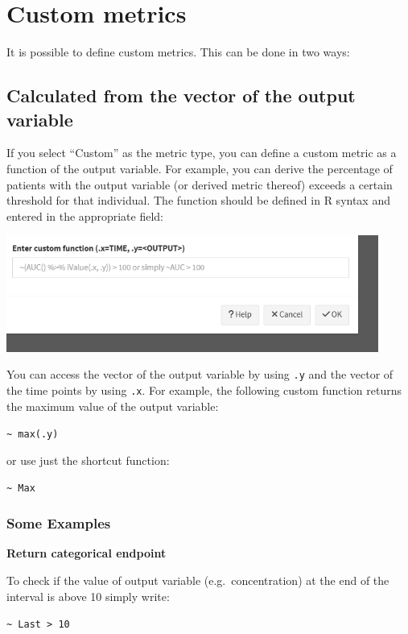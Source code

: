 \documentclass[
]{book}
\begin{document}
\section{Custom metrics}\label{custom-metrics}

It is possible to define custom metrics. This can be done in two ways:

\subsection{Calculated from the vector of the output variable}\label{calculated-from-the-vector-of-the-output-variable}

If you select ``Custom'' as the metric type, you can define a custom metric as a function of the output variable. For example, you can derive the percentage of patients with the output variable (or derived metric thereof) exceeds a certain threshold for that individual. The function should be defined in R syntax and entered in the appropriate field:

\includegraphics[width=4.8125in,height=\textheight]{pictures/custom-metric1.png}

You can access the vector of the output variable by using \texttt{.y} and the vector of the time points by using \texttt{.x}. For example, the following custom function returns the maximum value of the output variable:

\texttt{\textasciitilde{}\ max(.y)}

or use just the shortcut function:

\texttt{\textasciitilde{}\ Max}

\subsubsection{Some Examples}\label{some-examples}

\textbf{Return categorical endpoint}

To check if the value of output variable (e.g.~concentration) at the end of the interval is above 10 simply write:

\texttt{\textasciitilde{}\ Last\ \textgreater{}\ 10}
\end{document}
